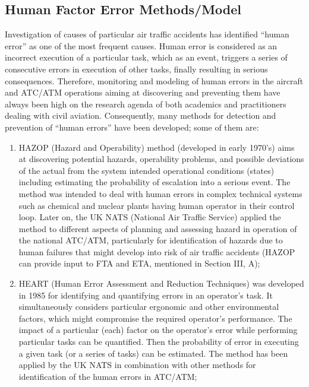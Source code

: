 \documentclass[a4paper, 10pt]{article}
\begin{document}
\begin{enumerate}
\section{Human Factor Error Methods/Model}

Investigation of causes of particular air traffic accidents has
identified “human error” as one of the most frequent causes. Human error is considered as an incorrect execution of a
particular task, which as an event, triggers a series of
consecutive errors in execution of other tasks, finally resulting
in serious consequences. Therefore, monitoring and modeling of human errors in the
aircraft and ATC/ATM operations aiming at discovering and
preventing them have always been high on the research agenda
of both academics and practitioners dealing with civil aviation.
Consequently, many methods for detection and prevention of
				“human errors” have been developed; some of them are:
\begin{enumerate}
		\item HAZOP (Hazard and Operability) method (developed
				in early 1970’s) aims at discovering potential hazards,
				operability problems, and possible deviations of the actual from
				the system intended operational conditions (states) including
				estimating the probability of escalation into a serious event.
				The method was intended to deal with human errors in
				complex technical systems such as chemical and nuclear plants
				having human operator in their control loop. Later on, the UK
				NATS (National Air Traffic Service) applied the method to
				different aspects of planning and assessing hazard in operation
				of the national ATC/ATM, particularly for identification of
				hazards due to human failures that might develop into risk of
				air traffic accidents (HAZOP can provide input to FTA and
				ETA, mentioned in Section III, A);
		\item HEART (Human Error Assessment and Reduction
				Techniques) was developed in 1985 for identifying and
				quantifying errors in an operator’s task. It simultaneously
				considers particular ergonomic and other environmental
				factors, which might compromise the required operator’s
				performance. The impact of a particular (each) factor on the
				operator’s error while performing particular tasks can be
				quantified. Then the probability of error in executing a given
				task (or a series of tasks) can be estimated. The method has
				been applied by the UK NATS in combination with other
				methods for identification of the human errors in ATC/ATM;

\end{enumerate}
\end{enumerate}
\end{document}
